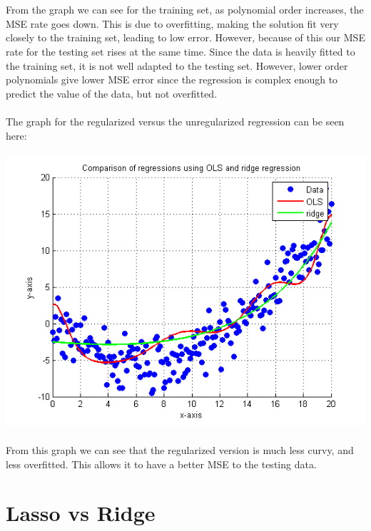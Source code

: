 \documentclass[paper=a4, fontsize=11pt]{scrartcl} %
\numberwithin{equation}{section} %
\numberwithin{figure}{section} %
\numberwithin{table}{section} %
\begin{document}
	\\\\
	From the graph we can see for the training set, as polynomial order increases, the MSE rate goes down. This is due to overfitting, making the solution fit very closely to the training set, leading to low error. However, because of this our MSE rate for the testing set rises at the same time. Since the data is heavily fitted to the training set, it is not well adapted to the testing set. However, lower order polynomials give lower MSE error since the regression is complex enough to predict the value of the data, but not overfitted.
	\\\\
	The graph for the regularized versus the unregularized regression can be seen here:
	\\\\
	\includegraphics[]{OLS_vs_ridge}
	\\\\
	From this graph we can see that the regularized version is much less curvy, and less overfitted. This allows it to have a better MSE to the testing data.
	\newpage
	\section{Lasso vs Ridge}
	
\end{document}
